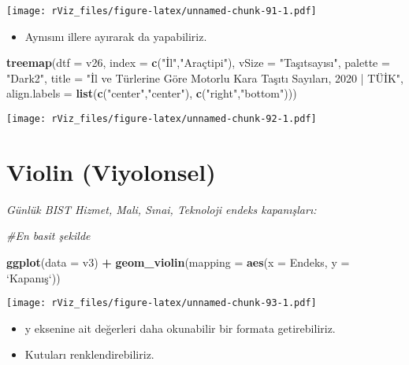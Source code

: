\documentclass[
]{book}
\newenvironment{Shaded}{\begin{snugshade}}{\end{snugshade}}
\newcommand{\CommentTok}[1]{\textcolor[rgb]{0.56,0.35,0.01}{\textit{#1}}}
\newcommand{\DataTypeTok}[1]{\textcolor[rgb]{0.13,0.29,0.53}{#1}}
\newcommand{\KeywordTok}[1]{\textcolor[rgb]{0.13,0.29,0.53}{\textbf{#1}}}
\newcommand{\NormalTok}[1]{#1}
\newcommand{\OperatorTok}[1]{\textcolor[rgb]{0.81,0.36,0.00}{\textbf{#1}}}
\newcommand{\StringTok}[1]{\textcolor[rgb]{0.31,0.60,0.02}{#1}}
\providecommand{\tightlist}{%
  \setlength{\itemsep}{0pt}\setlength{\parskip}{0pt}}
\begin{document}
\texttt{[image: rViz\_files/figure-latex/unnamed-chunk-91-1.pdf]}

\begin{itemize}
\tightlist
\item
  Aynısını illere ayırarak da yapabiliriz.
\end{itemize}

\begin{Shaded}
\begin{Highlighting}[]
\KeywordTok{treemap}\NormalTok{(}\DataTypeTok{dtf =}\NormalTok{ v26,}
        \DataTypeTok{index =} \KeywordTok{c}\NormalTok{(}\StringTok{"İl"}\NormalTok{,}\StringTok{"Araçtipi"}\NormalTok{),}
        \DataTypeTok{vSize =} \StringTok{"Taşıtsayısı"}\NormalTok{,}
        \DataTypeTok{palette =} \StringTok{"Dark2"}\NormalTok{,}
        \DataTypeTok{title =} \StringTok{"İl ve Türlerine Göre Motorlu Kara Taşıtı Sayıları, 2020 | TÜİK"}\NormalTok{,}
        \DataTypeTok{align.labels =} \KeywordTok{list}\NormalTok{(}\KeywordTok{c}\NormalTok{(}\StringTok{"center"}\NormalTok{,}\StringTok{"center"}\NormalTok{), }\KeywordTok{c}\NormalTok{(}\StringTok{"right"}\NormalTok{,}\StringTok{"bottom"}\NormalTok{)))}
\end{Highlighting}
\end{Shaded}

\texttt{[image: rViz\_files/figure-latex/unnamed-chunk-92-1.pdf]}

\hypertarget{violin-viyolonsel}{%
\section{Violin (Viyolonsel)}\label{violin-viyolonsel}}

\emph{Günlük BIST Hizmet, Mali, Sınai, Teknoloji endeks kapanışları:}

\begin{Shaded}
\begin{Highlighting}[]
\CommentTok{#En basit şekilde}

\KeywordTok{ggplot}\NormalTok{(}\DataTypeTok{data =}\NormalTok{ v3) }\OperatorTok{+}
\StringTok{  }\KeywordTok{geom_violin}\NormalTok{(}\DataTypeTok{mapping =} \KeywordTok{aes}\NormalTok{(}\DataTypeTok{x =}\NormalTok{ Endeks, }\DataTypeTok{y =} \StringTok{`}\DataTypeTok{Kapanış}\StringTok{`}\NormalTok{))}
\end{Highlighting}
\end{Shaded}

\texttt{[image: rViz\_files/figure-latex/unnamed-chunk-93-1.pdf]}

\begin{itemize}
\item
  y eksenine ait değerleri daha okunabilir bir formata getirebiliriz.
\item
  Kutuları renklendirebiliriz.
\end{itemize}
\end{document}
